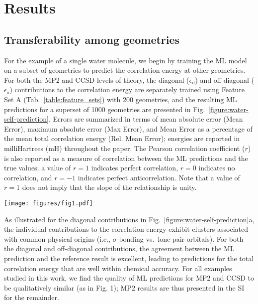 \documentclass[%
 aps,
 prb,
 twocolumn,
%
 reprint,%
%
citeautoscript,
%
showkeys
]{revtex4-1}
\begin{document}
\section{Results} %

\subsection{Transferability among geometries}
%
%
%
For the example of a single water molecule, we begin by training the ML model on a subset of geometries to predict the correlation energy at other geometries. For both the MP2 and CCSD levels of theory, the diagonal ($\epsilon_{\textrm{d}}$) and off-diagonal ($\epsilon_{\textrm{o}}$) contributions to the correlation energy are separately trained using Feature Set A (Tab.~\ref{table:feature_sets}) with 200  geometries, and the  resulting ML predictions for a superset of 1000 geometries are presented in Fig.~\ref{figure:water-self-prediction}.
Errors are summarized in terms of mean absolute error (Mean Error), maximum absolute error (Max Error), and Mean Error as a percentage of the mean total correlation energy (Rel. Mean Error); 
energies are reported in milliHartrees (mH) throughout the paper. 
The Pearson correlation coefficient ($r$) is also reported as a measure of correlation between the ML predictions and the true values;\cite{Pearson1896} a value of $r=1$ indicates perfect correlation, $r=0$ indicates no correlation, and $r=-1$ indicates perfect anticorrelation. Note that a value of $r=1$ does not imply that the slope of the relationship is unity.
%

\begin{figure*}[htbp]
\texttt{[image: figures/fig1.pdf]}
\caption{
ML predictions of MP2 (a-c) and CCSD (d-f) results for a water molecule, training on  200  geometries and predicting for 1000 geometries, 
including $\epsilon_{\textrm{d}}$ (a,d) and $\epsilon_{\textrm{o}}$ (b,e) for the pairs of occupied orbitals, as well as the total correlation energies (c,f).  Mean absolute errors (Mean), maximum absolute errors (Max), Mean Errors as a fraction of total correlation energy (Rel. Mean), and the Pearson correlation coefficient ($r$) are reported; all energies in mH. The guideline indicates zero error, with the region of %
up to 2 mH error indicated via shading. %
%
%
%
}
\label{figure:water-self-prediction}
%
%
%
%
\end{figure*}
As illustrated for the diagonal contributions in Fig.~\ref{figure:water-self-prediction}a, the individual contributions to the correlation energy exhibit clusters associated with common physical origins (i.e., $\sigma$-bonding vs.~lone-pair orbitals). 
%
 For both the diagonal and off-diagonal contributions, the agreement between the ML prediction and the reference result is excellent, %
 leading to predictions for the total correlation energy that are well within chemical accuracy. %
For all examples studied in this work, we find the quality of ML predictions for MP2 and CCSD to be qualitatively similar (as in Fig. 1); MP2 results are thus presented in the SI for the remainder. %
 
\end{document}
